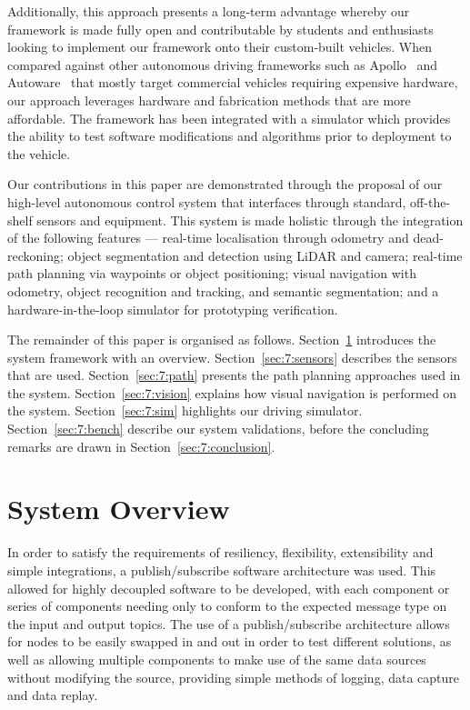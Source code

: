 
Additionally, this approach presents a long-term advantage whereby our framework is made fully open and contributable by students and enthusiasts looking to implement our framework onto their custom-built vehicles. When compared against other autonomous driving frameworks such as Apollo~\cite{baidu_apollo_nodate} and Autoware~\cite{autoware_autoware_nodate} that mostly target commercial vehicles requiring expensive hardware, our approach leverages hardware and fabrication methods that are more affordable. The framework has been integrated with a simulator which provides the ability to test software modifications and algorithms prior to deployment to the vehicle.

Our contributions in this paper are demonstrated through the proposal of our high-level autonomous control system that interfaces through standard, off-the-shelf sensors and equipment. This system is made holistic through the integration of the following features --- real-time localisation through odometry and dead-reckoning; object segmentation and detection using LiDAR and camera; real-time path planning via waypoints or object positioning; visual navigation with odometry, object recognition and tracking, and semantic segmentation; and a hardware-in-the-loop simulator for prototyping verification.  

The remainder of this paper is organised as follows. Section~\ref{sec:7:overview} introduces the system framework with an overview. Section~\ref{sec:7:sensors} describes the sensors that are used. Section~\ref{sec:7:path} presents the path planning approaches used in the system. Section~\ref{sec:7:vision} explains how visual navigation is performed on the system. Section~\ref{sec:7:sim} highlights our driving simulator. Section~\ref{sec:7:bench} describe our system validations, before the concluding remarks are drawn in Section~\ref{sec:7:conclusion}.

\section{System Overview}\label{sec:7:overview}
In order to satisfy the requirements of resiliency, flexibility, extensibility and simple integrations, a publish/subscribe software architecture was used. This allowed for highly decoupled software to be developed, with each component or series of components needing only to conform to the expected message type on the input and output topics.  The use of a publish/subscribe architecture allows for nodes to be easily swapped in and out in order to test different solutions, as well as allowing multiple components to make use of the same data sources without modifying the source, providing simple methods of logging, data capture and data replay.

